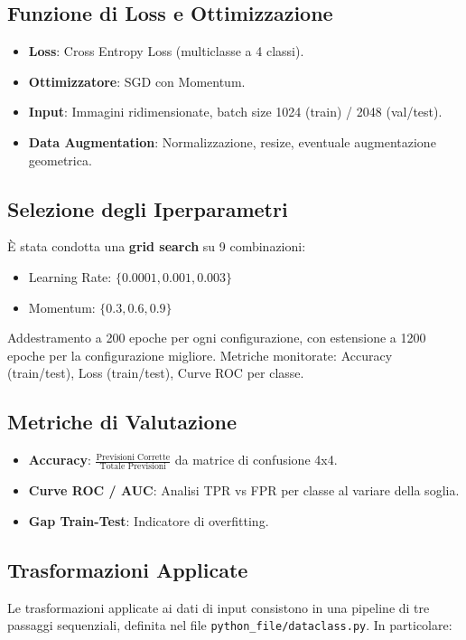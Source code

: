 \documentclass[openany,italian,12pt]{article}
\begin{document}
\subsection*{Funzione di Loss e Ottimizzazione}
\begin{itemize}
    \item \textbf{Loss}: Cross Entropy Loss (multiclasse a 4 classi).
    \item \textbf{Ottimizzatore}: SGD con Momentum.
    \item \textbf{Input}: Immagini ridimensionate, batch size 1024 (train) / 2048 (val/test).
    \item \textbf{Data Augmentation}: Normalizzazione, resize, eventuale augmentazione geometrica.
\end{itemize}

\subsection*{Selezione degli Iperparametri}
È stata condotta una \textbf{grid search} su 9 combinazioni:
\begin{itemize}
    \item Learning Rate: $\{0.0001, 0.001, 0.003\}$
    \item Momentum: $\{0.3, 0.6, 0.9\}$
\end{itemize}
Addestramento a 200 epoche per ogni configurazione, con estensione a 1200 epoche per la configurazione migliore. Metriche monitorate: Accuracy (train/test), Loss (train/test), Curve ROC per classe.

\subsection*{Metriche di Valutazione}
\begin{itemize}
    \item \textbf{Accuracy}: $\frac{\text{Previsioni Corrette}}{\text{Totale Previsioni}}$ da matrice di confusione 4x4.
    \item \textbf{Curve ROC / AUC}: Analisi TPR vs FPR per classe al variare della soglia.
    \item \textbf{Gap Train-Test}: Indicatore di overfitting.
\end{itemize}

\subsection*{Trasformazioni Applicate}
Le trasformazioni applicate ai dati di input consistono in una pipeline di tre passaggi sequenziali, definita nel file \texttt{python\_file/dataclass.py}. In particolare:
\end{document}
